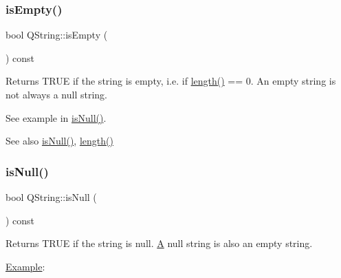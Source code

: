 \subsubsection{\texorpdfstring{isEmpty()}{isEmpty()}}
{\footnotesize\ttfamily bool Q\+String\+::is\+Empty (\begin{DoxyParamCaption}{ }\end{DoxyParamCaption}) const\hspace{0.3cm}{\ttfamily [inline]}}

Returns T\+R\+UE if the string is empty, i.\+e. if \mbox{\hyperlink{class_q_string_ac431a733d01111059c8364c62ed53270}{length()}} == 0. An empty string is not always a null string.

See example in \mbox{\hyperlink{class_q_string_a6a6da156364a32ef91e35f83b1955acc}{is\+Null()}}.

\begin{DoxySeeAlso}{See also}
\mbox{\hyperlink{class_q_string_a6a6da156364a32ef91e35f83b1955acc}{is\+Null()}}, \mbox{\hyperlink{class_q_string_ac431a733d01111059c8364c62ed53270}{length()}} 
\end{DoxySeeAlso}
\mbox{\label{class_q_string_a6a6da156364a32ef91e35f83b1955acc}} 
\subsubsection{\texorpdfstring{isNull()}{isNull()}}
{\footnotesize\ttfamily bool Q\+String\+::is\+Null (\begin{DoxyParamCaption}{ }\end{DoxyParamCaption}) const\hspace{0.3cm}{\ttfamily [inline]}}

Returns T\+R\+UE if the string is null. \mbox{\hyperlink{class_a}{A}} null string is also an empty string.

\mbox{\hyperlink{struct_example}{Example}}\+: 
\begin{DoxyCode}{0}
\end{DoxyCode}



